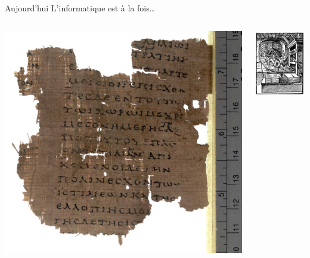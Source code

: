 \begin{frame}{Aujourd'hui}
\Large L'informatique est à la fois\ldots

\vfill

\begin{columns}
\begin{column}{0.33\linewidth}
\centering
\includegraphics[height=0.35\paperheight]{../resources/illustrations/histories-fragment} \\
\end{column}
\begin{column}{0.33\linewidth}
\centering
\includegraphics[height=0.35\paperheight]{../resources/illustrations/gutenberg} \\
\end{column}

\end{columns}
\end{frame}

